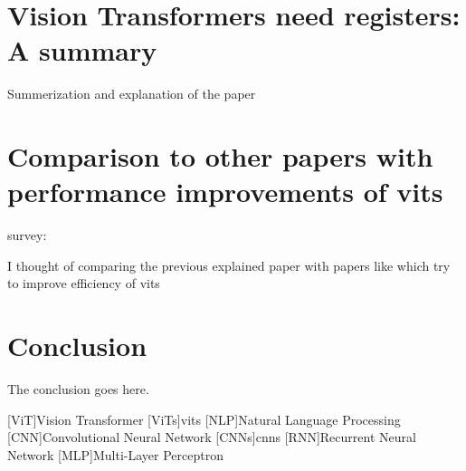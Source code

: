 \documentclass[conference]{IEEEtran}
\begin{document}
\section{Vision Transformers need registers: A summary}
Summerization and explanation of the paper \cite{darcet2024visiontransformersneedregisters} \cite{wang2024mambarvisionmambaneeds}

\section{Comparison to other papers with performance improvements of \ac{vit}s}
survey: \cite{10.1145/3586074} 

I thought of comparing the previous explained paper \cite{darcet2024visiontransformersneedregisters} with papers like \cite{wen2024efficientvisionlanguagemodelssummarizing} \cite{Yin_2022_CVPR} \cite{10.1007/978-3-031-20053-3_30} \cite{ryoo2022tokenlearner8learnedtokens} \cite{Liu2024-lm} which try to improve efficiency of \ac{vit}s 

\section{Conclusion}
The conclusion goes here.

\printbibliography


\begin{acronym}
	[ViT]{Vision Transformer}
  [ViTs]{\ac{vit}s}
  [NLP]{Natural Language Processing}
  [CNN]{Convolutional Neural Network}
  [CNNs]{\acp{cnn}}
  [RNN]{Recurrent Neural Network}
  [MLP]{Multi-Layer Perceptron}
\end{acronym}


\end{document}
